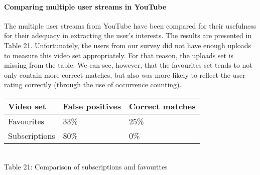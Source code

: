 \paragraph{Comparing multiple user streams in YouTube}

The multiple user streams from YouTube have been compared for their usefulness
for their adequacy in extracting the user's interests. The results are presented
in Table 21. Unfortunately, the users from our survey did not have enough
uploads to measure this video set appropriately. For that reason, the uploads
set is missing from the table. We can see, however, that the favourites set
tends to not only contain more correct matches, but also was more likely to
reflect the user rating correctly (through the use of occurrence counting).

\begin{center}
  \begin{tabular}{| l | l | l |}
  Video set & False positives & Correct matches \\ \hline
  Favourites & 33\% & 25\% \\
  Subscriptions & 80\% & 0\% \\
  \end{tabular} \\
  Table 21: Comparison of subscriptions and favourites
\end{center}
